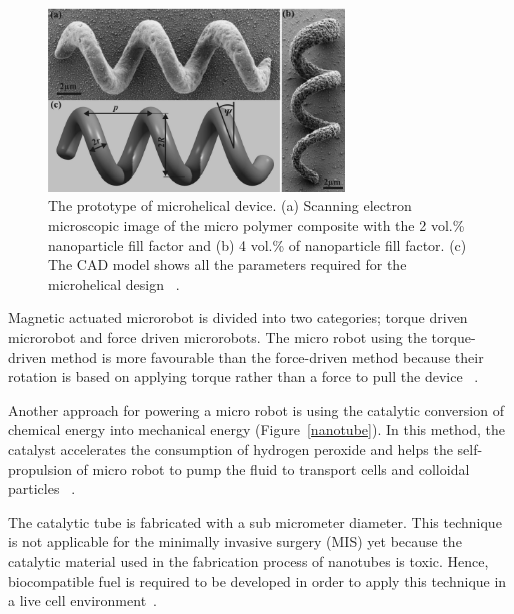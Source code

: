 \documentclass[12pt,a4paper,titlepage]{report}
\begin{document}
\begin{figure}
  \centering
    \includegraphics[width=0.7\textwidth]{8}
  \caption{ The prototype of microhelical device. (a) Scanning electron microscopic image of the micro polymer composite
with the 2 vol.\% nanoparticle fill factor and (b) 4 vol.\% of nanoparticle fill factor. (c) The CAD model
shows all the parameters required for the microhelical design ~\citep{peyer2013bacteria}.}
  \label{ref8}
\end{figure}

Magnetic actuated microrobot is divided into two categories; torque driven microrobot and force
 driven microrobots.
The micro robot using the torque-driven method is more favourable than the force-driven method 
because their rotation is based on applying torque rather than a force to pull the device ~\citep{peyer2013bacteria}.













Another approach for powering a micro robot is using the catalytic conversion of chemical energy
 into mechanical energy (Figure~\ref{nanotube}). In this method, the catalyst accelerates the consumption of hydrogen peroxide
 and helps the self-propulsion of micro robot to pump the fluid to transport cells and colloidal 
particles ~\citep{C2NR32798H}.

The catalytic tube is fabricated with a sub micrometer diameter.
 This technique is not applicable for the minimally invasive surgery (MIS) yet because the catalytic
 material used in the fabrication process of nanotubes is toxic. Hence, biocompatible fuel is required to be developed in order to 
apply this technique in a live cell environment~\citep{C2NR32798H}.
\end{document}
